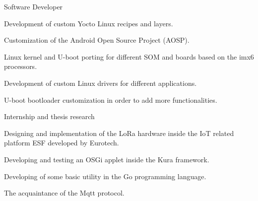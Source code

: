 \documentclass[english,a4paper]{europasscv}
\begin{document}
\begin{europasscv}


		 {
			Software Developer
		}
		\ecvitem{} {
			\begin{ecvitemize}
				\item Development of custom Yocto Linux recipes and layers.
				\item Customization of the Android Open Source Project (AOSP).
				\item Linux kernel and U-boot porting for different SOM and
					boards based on the imx6 processors.
				\item Development of custom Linux drivers for different
					applications.
				\item U-boot bootloader customization in order to add
					more functionalities.
			\end{ecvitemize}
		}

		 {
			Internship and thesis research
		}
		\ecvitem{} {
			\begin{ecvitemize}
					\item Designing and implementation of the LoRa hardware
						inside the IoT related platform ESF developed by
						Eurotech.
					\item Developing and testing an OSGi applet inside the Kura
						framework.
					\item Developing of some basic utility in the Go programming
						language.
					\item The acquaintance of the Mqtt protocol.
			\end{ecvitemize}
		}


\end{europasscv}
\end{document}
